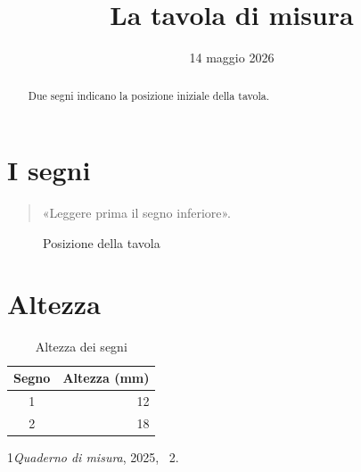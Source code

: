 \documentclass{article}
\begin{document}
\title{La tavola di misura}\author{}\date{14 maggio 2026}\maketitle
\begin{abstract}Due segni indicano la posizione iniziale della tavola.\end{abstract}
\tableofcontents
\section{I segni}\begin{quote}«Leggere prima il segno inferiore».\end{quote}
\begin{figure}[ht]\centering\fbox{\rule{0pt}{8mm}\rule{33mm}{0pt}}\caption{Posizione della tavola}\end{figure}
\section{Altezza}
\begin{table}[ht]\centering\begin{tabular}{cr}Segno&Altezza (mm)\\\hline 1&12\\2&18\end{tabular}\caption{Altezza dei segni}\end{table}
\begin{thebibliography}{1}\emph{Quaderno di misura}, 2025, \chaptername~2.\end{thebibliography}
\end{document}
